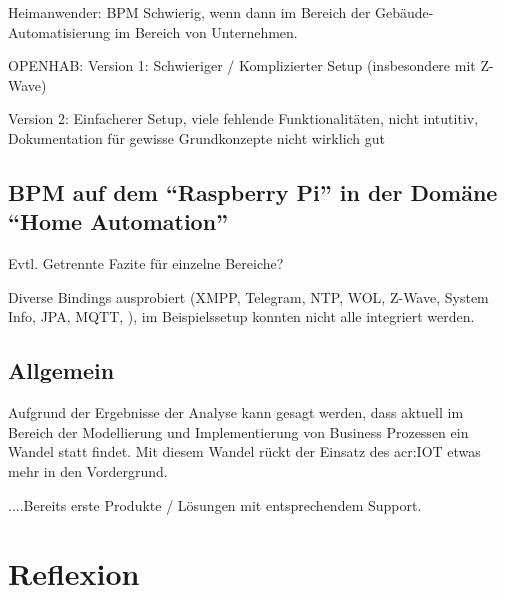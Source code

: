 Heimanwender: BPM Schwierig, wenn dann im Bereich der Gebäude-Automatisierung im Bereich von Unternehmen.


OPENHAB:
Version 1: Schwieriger / Komplizierter Setup (insbesondere mit Z-Wave)

Version 2: Einfacherer Setup, viele fehlende Funktionalitäten, nicht intutitiv, Dokumentation für gewisse Grundkonzepte nicht wirklich gut

\subsection{BPM auf dem "`Raspberry Pi"' in der Domäne "`Home Automation"'}
Evtl. Getrennte Fazite für einzelne Bereiche?

Diverse Bindings ausprobiert (XMPP, Telegram, NTP, WOL, Z-Wave, System Info, JPA, MQTT, ), im Beispielssetup konnten nicht alle integriert werden.

\subsection{Allgemein}
Aufgrund der Ergebnisse der Analyse kann gesagt werden, dass aktuell im Bereich der Modellierung und Implementierung von Business Prozessen ein Wandel statt findet. Mit diesem Wandel rückt der Einsatz des \gls{acr:IOT} etwas mehr in den Vordergrund. 

....Bereits erste Produkte / Lösungen mit entsprechendem Support.



\section{Reflexion}



